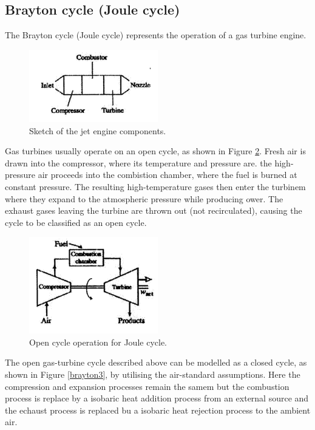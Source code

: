 \documentclass[class=report, crop=false, 12pt,a4paper]{standalone}
\begin{document}
\subsection{Brayton cycle (Joule cycle)}
The Brayton cycle (Joule cycle) represents the operation of a gas turbine engine.
\begin{figure}
  \centering
  \includegraphics[width = 0.5\textwidth]{../img/Brayton1}
  \caption{Sketch of the jet engine components.}
  \label{brayton1}
\end{figure}
Gas turbines usually operate on an open cycle, as shown in Figure \ref{brayton2}. Fresh air is drawn into the compressor, where its temperature and pressure are. the high-pressure air proceeds into the combistion chamber, where the fuel is burned at constant pressure. The resulting high-temperature gases then enter the turbinem where they expand to the atmospheric pressure while producing ower.  The exhaust gases leaving the turbine are thrown out (not recirculated), causing the cycle to be classified as an open cycle.
\begin{figure}
  \centering
  \includegraphics[width = 0.5\textwidth]{../img/Brayton2}
  \caption{Open cycle operation for Joule cycle.}
  \label{brayton2}
\end{figure}
The open gas-turbine cycle described above can be modelled as a closed cycle, as shown in Figure \ref{brayton3}, by utilising the air-standard assumptions. Here the compression and expansion processes remain the samem but the combustion process is replace by a isobaric heat addition process from an external source and the echaust process is replaced bu a isobaric heat rejection process to the ambient air.
\end{document}
